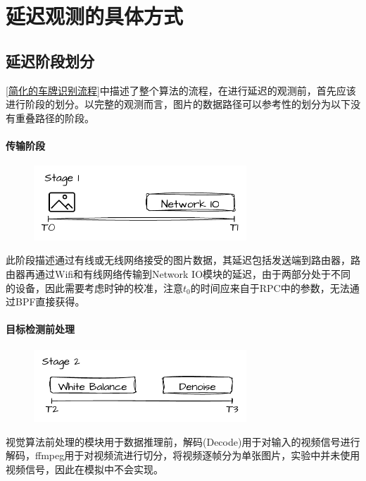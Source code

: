 \documentclass[master,anonymous]{shtthesis}
\begin{document}
\section{延迟观测的具体方式}
\subsection{延迟阶段划分}
\ref{简化的车牌识别流程}中描述了整个算法的流程，在进行延迟的观测前，首先应该进行阶段的划分。以完整的观测而言，图片的数据路径可以参考性的划分为以下没有重叠路径的阶段。

\paragraph{传输阶段}
\begin{figure}[H]
	\centering
	\includegraphics[width=8cm]{img/s1.pdf}
	\label{传输阶段}
\end{figure}
此阶段描述通过有线或无线网络接受的图片数据，其延迟包括发送端到路由器，路由器再通过Wifi和有线网络传输到Network IO模块的延迟，由于两部分处于不同的设备，因此需要考虑时钟的校准，注意$t_0$的时间应来自于RPC中的参数，无法通过BPF直接获得。


\paragraph{目标检测前处理}
\begin{figure}[H]
	\centering
	\includegraphics[width=8cm]{img/s2.pdf}
	\label{目标检测前处理阶段}
\end{figure}
视觉算法前处理的模块用于数据推理前，解码(Decode)用于对输入的视频信号进行解码，ffmpeg用于对视频流进行切分，将视频逐帧分为单张图片，实验中并未使用视频信号，因此在模拟中不会实现。
\end{document}
